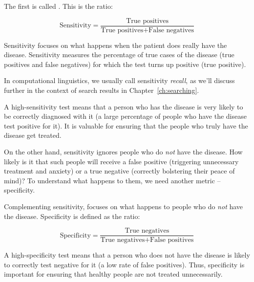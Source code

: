The first is called . This is the ratio:

\begin{equation}
 \mbox{Sensitivity} = \frac{\mbox{True positives}}{\mbox{True
    positives} + \mbox{False negatives}}
\end{equation}


Sensitivity focuses on what happens when the patient does really have the
disease. Sensitivity measures the percentage of true cases of the disease (true positives and false negatives) for which the test turns up positive (true positive). 

In computational linguistics, we usually call  sensitivity {\em recall}, as we'll discuss further in the context of search results in Chapter~\ref{ch:searching}. 
  
A high-sensitivity test means that a person who has the disease is very likely to be correctly diagnosed with it (a large percentage of people who have the disease test positive for it).  It is valuable for ensuring that the people who truly have the disease get treated.
  
  On the other hand, sensitivity ignores people who do \emph{not} have the disease.  How likely is it that such people will receive a false positive (triggering unnecessary treatment and anxiety) or a true negative (correctly bolstering their peace of mind)?  To understand what happens to them, we need another metric -- specificity.



Complementing sensitivity,  focuses on what happens to people who do \emph{not} have the disease. Specificity is defined as the ratio:



\begin{equation} 
\mbox{Specificity} = \frac{\mbox{True negatives}}{\mbox{True
    negatives} + \mbox{False positives}} 
\end{equation}



A high-specificity test means that a person who does not have the disease is likely to correctly test negative for it (a  low rate of false positives).  Thus, specificity is important for ensuring that healthy people are not treated unnecessarily.




